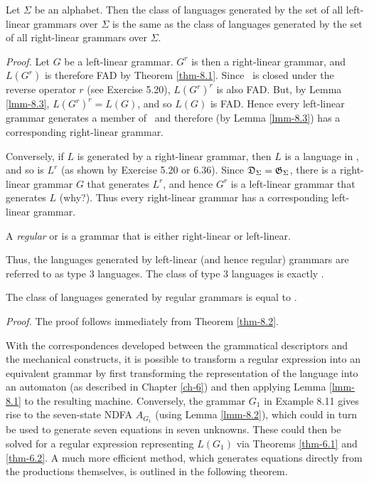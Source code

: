 \begin{thm}\label{thm-8.2}
Let $\Sigma$ be an alphabet. Then the class of languages generated by the set of
all left-linear grammars over $\Sigma$ is the same as the class of languages
generated by the set of all right-linear grammars over $\Sigma$.

\emph{Proof.} Let $G$ be a left-linear grammar. $G^r$ is then a right-linear
grammar, and $L(G^r)$ is therefore FAD by Theorem \ref{thm-8.1}. Since \DSIG\ is closed
under the reverse operator $r$ (see Exercise 5.20), $L(G^r)^r$ is also FAD. But,
by Lemma \ref{lmm-8.3}, $L(G^r)^r = L(G)$, and so $L(G)$ is FAD. Hence every left-linear
grammar generates a member of \DSIG\ and therefore (by Lemma \ref{lmm-8.3}) has a corresponding
right-linear grammar.

Conversely, if $L$ is generated by a right-linear grammar, then $L$ is a
language in \DSIG, and so is $L^r$ (as shown by Exercise 5.20 or 6.36). Since
$\mathfrak{D}_\Sigma=\mathfrak{G}_\Sigma$, there is a right-linear grammar $G$ that generates $L^r$, and
hence $G^r$ is a left-linear grammar that generates $L$ (why?). Thus every
right-linear grammar has a corresponding left-linear grammar.
\end{thm}

\begin{dfn}\label{dfn-8.13}
A \emph{regular} or \emph{} is a grammar that is either
right-linear or left-linear.
\end{dfn}
Thus, the languages generated by left-linear (and hence regular) grammars are
referred to as type 3 languages. The class of type 3 languages is exactly \GSIG.

\begin{cor}\label{cor-8.1}
The class of languages generated by regular grammars is equal to \GSIG.

\emph{Proof.} The proof follows immediately from Theorem \ref{thm-8.2}.
\end{cor}

With the correspondences developed between the grammatical descriptors and the
mechanical constructs, it is possible to transform a regular expression into
an equivalent grammar by first transforming the representation of the language
into an automaton (as described in Chapter \ref{ch-6}) and then applying Lemma \ref{lmm-8.1} to the
resulting machine. Conversely, the grammar $G_1$ in Example 8.11 gives rise to
the seven-state NDFA $A_{G_1}$ (using Lemma \ref{lmm-8.2}), which could in turn be used to
generate seven equations in seven unknowns. These could then be solved for a
regular expression representing $L(G_1)$ via Theorems \ref{thm-6.1} and \ref{thm-6.2}. A much more
efficient method, which generates equations directly from the productions
themselves, is outlined in the following theorem.

